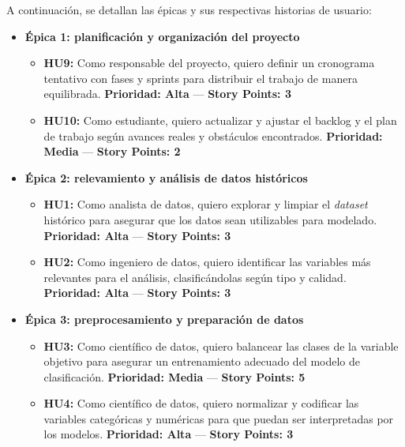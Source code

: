 \documentclass[
11pt, %
]{charter}
\begin{document}
A continuación, se detallan las épicas y sus respectivas historias de usuario:

\begin{itemize}
  \item \textbf{Épica 1: planificación y organización del proyecto}
    \begin{itemize}
      \item \textbf{HU9:} Como responsable del proyecto, quiero definir un cronograma tentativo con fases y sprints para distribuir el trabajo de manera equilibrada.  
      \newline \textbf{Prioridad: Alta} — \textbf{Story Points: 3}

      \item \textbf{HU10:} Como estudiante, quiero actualizar y ajustar el backlog y el plan de trabajo según avances reales y obstáculos encontrados.  
      \newline \textbf{Prioridad: Media} — \textbf{Story Points: 2}
    \end{itemize}

  \item \textbf{Épica 2: relevamiento y análisis de datos históricos}
    \begin{itemize}
      \item \textbf{HU1:} Como analista de datos, quiero explorar y limpiar el \textit{dataset} histórico para asegurar que los datos sean utilizables para modelado.  
      \newline \textbf{Prioridad: Alta} — \textbf{Story Points: 3}
      
      \item \textbf{HU2:} Como ingeniero de datos, quiero identificar las variables más relevantes para el análisis, clasificándolas según tipo y calidad.  
      \newline \textbf{Prioridad: Alta} — \textbf{Story Points: 3}
    \end{itemize}

  \item \textbf{Épica 3: preprocesamiento y preparación de datos}
    \begin{itemize}
      \item \textbf{HU3:} Como científico de datos, quiero balancear las clases de la variable objetivo para asegurar un entrenamiento adecuado del modelo de clasificación.  
      \newline \textbf{Prioridad: Media} — \textbf{Story Points: 5}

      \item \textbf{HU4:} Como científico de datos, quiero normalizar y codificar las variables categóricas y numéricas para que puedan ser interpretadas por los modelos.  
      \newline \textbf{Prioridad: Alta} — \textbf{Story Points: 3}
    \end{itemize}


\end{itemize}
\end{document}
